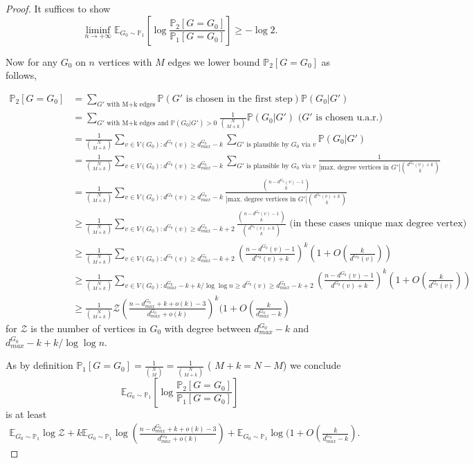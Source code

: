\documentclass[12pt,a4paper]{article}
\numberwithin{equation}{section}
\numberwithin{equation}{section}
\newcommand{\1}{{\text{\Large $\mathfrak 1$}}}
\newcommand{\2}[1]{{\text{\Large $\mathfrak 1$}\!\left(#1\right)}}
\begin{document}
\begin{proof}
It suffices to show $$ \liminf_{n \rightarrow + \infty} \mathbb{E}_{G_0 \sim \mathbb{P}_1} \left[ \log \frac{\mathbb{P}_2[G=G_0]}{\mathbb{P}_1[G=G_0]}  \right] \geq -\log 2.$$

Now for any $G_0$ on $n$ vertices with $M$ edges we lower bound $\mathbb{P}_2[G=G_0]$ as follows,

\begin{align*}
\mathbb{P}_2[G=G_0]&=\sum_{G' \text{ with M+k edges}} \mathbb{P}(G' \text{ is chosen in the first step}) \mathbb{P}(G_0|G')\\
&=\sum_{G' \text{ with M+k edges and }\mathbb{P}(G_0|G')>0 } \frac{1}{\binom{N}{M+k}} \mathbb{P}(G_0|G') \text{ ($G'$ is chosen u.a.r.)}\\
&= \frac{1}{\binom{N}{M+k}} \sum_{v \in V(G_0)  : d^{G_0}(v)  \geq d^{G_0}_{max}-k} \sum_{G' \text{ is plausible by } G_0 \text{ via } v}\mathbb{P}(G_0|G')   \\
&=  \frac{1}{\binom{N}{M+k}} \sum_{v \in V(G_0) : d^{G_0}(v)  \geq d^{G_0}_{max}-k} \sum_{G' \text{ is plausible by } G_0 \text{ via } v}\frac{1}{|\text{max. degree vertices in } G'|\binom{d^{G_0}(v)+k}{k}}\\
&=  \frac{1}{\binom{N}{M+k}} \sum_{v \in V(G_0) : d^{G_0}(v)  \geq d^{G_0}_{max}-k} \frac{\binom{n-d^{G_0}(v)-1}{k}}{|\text{max. degree vertices in } G'|\binom{d^{G_0}(v)+k}{k}}\\
&\geq   \frac{1}{\binom{N}{M+k}} \sum_{v \in V(G_0) : d^{G_0}(v)  \geq d^{G_0}_{max}-k+2} \frac{\binom{n-d^{G_0}(v)-1}{k}}{\binom{d^{G_0}(v)+k}{k}} \text{ (in these cases unique max degree vertex)}\\
&\geq   \frac{1}{\binom{N}{M+k}} \sum_{v \in V(G_0) : d^{G_0}(v)  \geq d^{G_0}_{max}-k+2} \left(\frac{n-d^{G_0}(v)-1}{d^{G_0}(v)+k}\right)^{k}(1+O(\frac{k}{d^{G_0}(v)}))\\
&\geq   \frac{1}{\binom{N}{M+k}} \sum_{v \in V(G_0) : d^{G_0}_{max}-k+k/\log \log n \geq d^{G_0}(v)  \geq d^{G_0}_{max}-k+2} \left(\frac{n-d^{G_0}(v)-1}{d^{G_0}(v)+k}\right)^{k}(1+O(\frac{k}{d^{G_0}(v)}))\\
&\geq   \frac{1}{\binom{N}{M+k}} \mathcal{Z}\left(\frac{n-d^{G_0}_{max}+k+o(k)-3}{d^{G_0}_{max}+o(k)}\right)^{k}(1+O(\frac{k}{d^{G_0}_{max}-k})
\end{align*} for $\mathcal{Z}$ is the number of vertices in $G_0$ with degree between $d^{G_0}_{max}-k$ and $d^{G_0}_{max}-k+k/\log \log n$. 

As by definition $\mathbb{P}_1[G=G_0]=\frac{1}{\binom{N}{M}}=\frac{1}{\binom{N}{M+k}}$ ( $M+k=N-M$) we conclude 
$$\mathbb{E}_{G_0 \sim \mathbb{P}_1} \left[ \log \frac{\mathbb{P}_2[G=G_0]}{\mathbb{P}_1[G=G_0]}  \right]$$is at least
\begin{align*}\mathbb{E}_{G_0 \sim \mathbb{P}_1} \log \mathcal{Z}+k\mathbb{E}_{G_0 \sim \mathbb{P}_1}\log \left(\frac{n-d^{G_0}_{max}+k+o(k)-3}{d^{G_0}_{max}+o(k)}\right)+\mathbb{E}_{G_0 \sim \mathbb{P}_1}\log (1+O(\frac{k}{d^{G_0}_{max}-k}).\end{align*} 



\end{proof}
\end{document}
